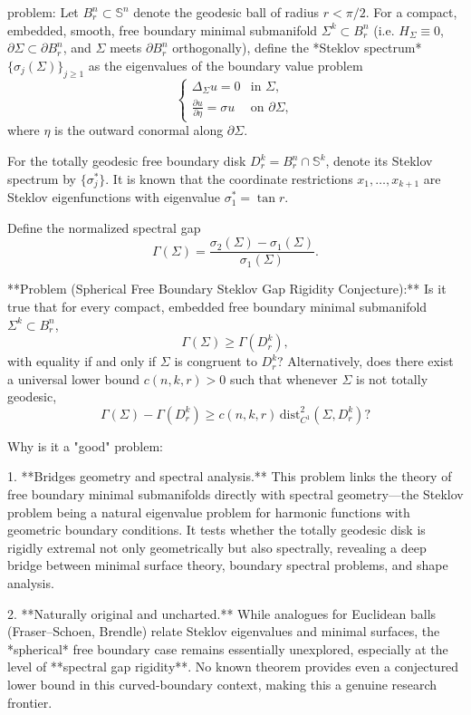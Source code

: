 problem:  
Let \(B_r^n \subset \mathbb{S}^n\) denote the geodesic ball of radius \(r < \pi/2\).  
For a compact, embedded, smooth, free boundary minimal submanifold \(\Sigma^k \subset B_r^n\) (i.e. \(H_\Sigma \equiv 0\), \(\partial\Sigma \subset \partial B_r^n\), and \(\Sigma\) meets \(\partial B_r^n\) orthogonally), define the *Steklov spectrum* \(\{\sigma_j(\Sigma)\}_{j\ge1}\) as the eigenvalues of the boundary value problem
\[
\begin{cases}
\Delta_\Sigma u = 0 &\text{in } \Sigma,\\[4pt]
\frac{\partial u}{\partial \eta} = \sigma u &\text{on } \partial\Sigma,
\end{cases}
\]
where \(\eta\) is the outward conormal along \(\partial\Sigma\).

For the totally geodesic free boundary disk \(D_r^k = B_r^n \cap \mathbb{S}^k\), denote its Steklov spectrum by \(\{\sigma_j^*\}\).  
It is known that the coordinate restrictions \(x_1,\dots,x_{k+1}\) are Steklov eigenfunctions with eigenvalue \(\sigma_1^* = \tan r\).

Define the normalized spectral gap
\[
\Gamma(\Sigma) = \frac{\sigma_2(\Sigma) - \sigma_1(\Sigma)}{\sigma_1(\Sigma)} .
\]

**Problem (Spherical Free Boundary Steklov Gap Rigidity Conjecture):**  
Is it true that for every compact, embedded free boundary minimal submanifold \(\Sigma^k\subset B_r^n\),
\[
\Gamma(\Sigma) \ge \Gamma(D_r^k),
\]
with equality if and only if \(\Sigma\) is congruent to \(D_r^k\)?  
Alternatively, does there exist a universal lower bound \(c(n,k,r)>0\) such that whenever \(\Sigma\) is not totally geodesic,
\[
\Gamma(\Sigma) - \Gamma(D_r^k) \ge c(n,k,r)\, \mathrm{dist}^2_{C^1}(\Sigma, D_r^k) ?
\]

Why is it a "good" problem:  

1. **Bridges geometry and spectral analysis.**  
   This problem links the theory of free boundary minimal submanifolds directly with spectral geometry—the Steklov problem being a natural eigenvalue problem for harmonic functions with geometric boundary conditions. It tests whether the totally geodesic disk is rigidly extremal not only geometrically but also spectrally, revealing a deep bridge between minimal surface theory, boundary spectral problems, and shape analysis.

2. **Naturally original and uncharted.**  
   While analogues for Euclidean balls (Fraser–Schoen, Brendle) relate Steklov eigenvalues and minimal surfaces, the *spherical* free boundary case remains essentially unexplored, especially at the level of **spectral gap rigidity**. No known theorem provides even a conjectured lower bound in this curved-boundary context, making this a genuine research frontier.

